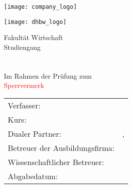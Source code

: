 \vspace*{-3cm}

\begin{center}
	\begin{minipage}[c]{.45\linewidth}
		\texttt{[image: company\_logo]}
	\end{minipage}\hfill
	\begin{minipage}[c]{.45\linewidth}
		\flushright
		\texttt{[image: dhbw\_logo]}
	\end{minipage}

	\vspace{2cm}
	\Large Fakultät Wirtschaft\\

	\vspace{2cm}
	\Large Studiengang \courseOfStudies \\

	\vspace{1cm}
	\fontsize{\titleFontSize}{\titleFontSize}\selectfont \thesisTitle \\

	\vspace{1cm}
	\thesisType \\

	\normalsize Im Rahmen der Prüfung zum \degree \\

	\ifblockingnotice
		\vspace{0.5cm}
		\Large \textcolor{red}{Sperrvermerk}\\
		\vspace{0.5cm}
	\else
		\vspace{2cm}
	\fi 


	\vfill
	\normalsize
	\begin{tabular}{l l}
		Verfasser: \hspace{1cm} 						& \name \\
		Kurs: \hspace{1cm} 							& \course \\ 
		Dualer Partner: \hspace{1cm} 				& \company, \companyLocation \\
		Betreuer der Ausbildungsfirma: \hspace{1cm} 	& \corporateAdvisor \\ 
		Wissenschaftlicher Betreuer: \hspace{1cm} 	& \universityAdvisor \\ 
		Abgabedatum: \hspace{1cm} 					& \submissionDate \\
	\end{tabular} 
\end{center}
